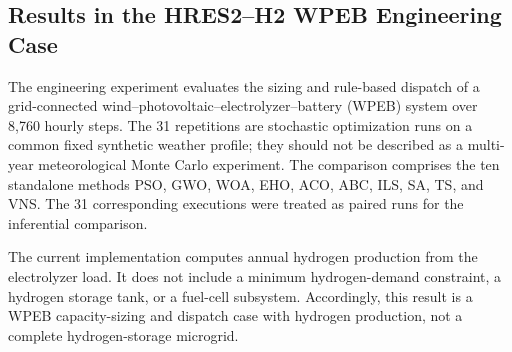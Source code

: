 
\subsection{Results in the HRES2--H2 WPEB Engineering Case}
\label{sec:results_hres2_revision}

The engineering experiment evaluates the sizing and rule-based dispatch of a
grid-connected wind--photovoltaic--electrolyzer--battery (WPEB) system over
8,760 hourly steps. The 31 repetitions are stochastic optimization runs on a
common fixed synthetic weather profile; they should not be described as a
multi-year meteorological Monte Carlo experiment. The comparison comprises
the ten standalone methods PSO, GWO, WOA, EHO, ACO, ABC, ILS, SA, TS, and VNS.
The 31 corresponding executions were treated as paired runs for the inferential comparison.

The current implementation computes annual hydrogen production from the
electrolyzer load. It does not include a minimum hydrogen-demand constraint, a
hydrogen storage tank, or a fuel-cell subsystem. Accordingly, this result is a
WPEB capacity-sizing and dispatch case with hydrogen production, not a complete
hydrogen-storage microgrid.

